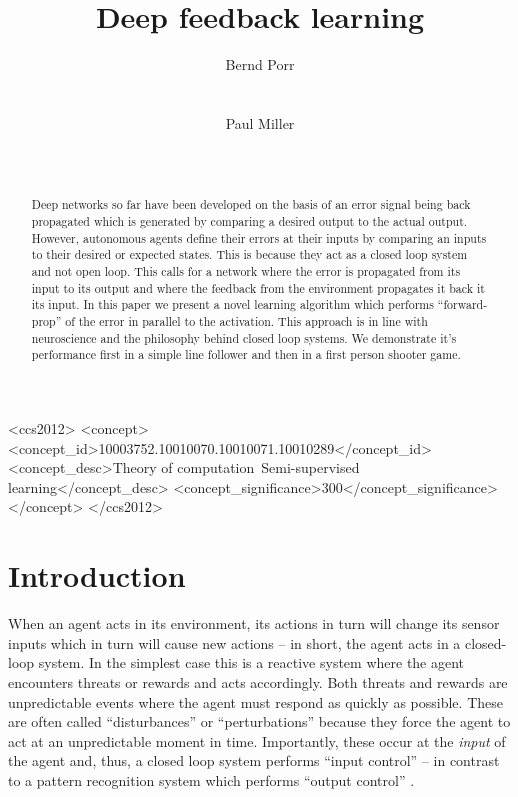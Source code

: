 \documentclass{aamas2018}
\title{Deep feedback learning}
\author{
%
\alignauthor
Bernd Porr\\
       \affaddr{Glasgow Neuro LTD}\\
       \affaddr{Glasgow, United Kingdom}\\
       \email{bernd@glasgowneuro.tech}
\alignauthor
Paul Miller\\
       \affaddr{Glasgow Neuro LTD}\\
       \affaddr{Glasgow, United Kingdom}\\
       \email{paul@glasgowneuro.tech}
}
\begin{document}
\maketitle

\begin{abstract}
  Deep networks so far have been developed on the basis of an error
  signal being back propagated which is generated by comparing a
  desired output to the actual output. However, autonomous agents
  define their errors at their inputs by comparing an inputs to their
  desired or expected states. This is because they act as a closed
  loop system and not open loop. This calls for a network where the
  error is propagated from its input to its output and where the
  feedback from the environment propagates it back it its input. In
  this paper we present a novel learning algorithm which performs
  ``forward-prop'' of the error in parallel to the activation. This
  approach is in line with neuroscience and the philosophy behind
  closed loop systems. We demonstrate it's performance first in a
  simple line follower and then in a first person shooter game.
\end{abstract}


 \begin{CCSXML}
<ccs2012>
<concept>
<concept_id>10003752.10010070.10010071.10010289</concept_id>
<concept_desc>Theory of computation~Semi-supervised learning</concept_desc>
<concept_significance>300</concept_significance>
</concept>
</ccs2012>
\end{CCSXML}



\printccsdesc





\section{Introduction}
When an agent acts in its environment, its actions in turn will change
its sensor inputs which in turn will cause new actions -- in short,
the agent acts in a closed-loop system. In the simplest case this is a
reactive system where the agent encounters threats or rewards and acts
accordingly. Both threats and rewards are unpredictable events where
the agent must respond as quickly as possible. These are often called
``disturbances'' or ``perturbations'' because they force the agent to
act at an unpredictable moment in time. Importantly, these occur at
the \textsl{input} of the agent and, thus, a closed loop system
performs ``input control'' -- in contrast to a pattern recognition
system which performs ``output control'' \cite{Phillips2000}.
\end{document}
